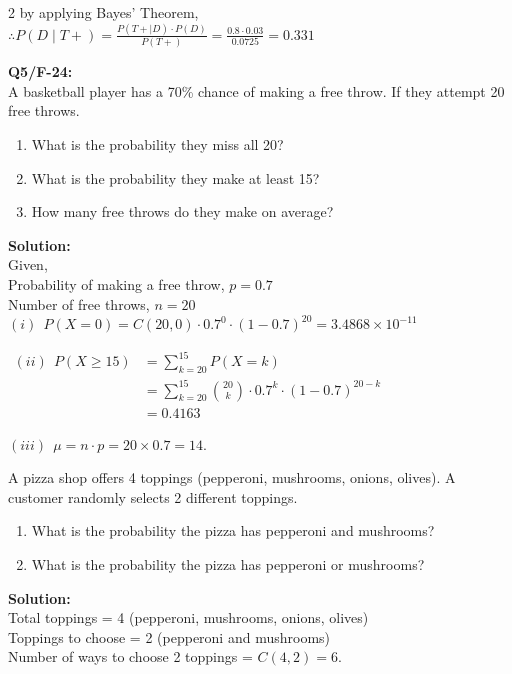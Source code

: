 \begin{multicols}{2}
by applying Bayes' Theorem,\\[0.5em]
$\therefore P(D\mid T+)
= \frac{P(T+\mid D) \cdot P(D)}{P(T+)}
= \frac{0.8 \cdot 0.03}{0.0725} = 0.331$

\columnbreak
\textbf{Q5/F-24:}\\[0.5em]
A basketball player has a 70\% chance of making a free throw. If they attempt 20 free throws.
\vspace{-1em}
\begin{enumerate}[leftmargin=*, label=$(\roman*)$]
\item What is the probability they miss all 20?
\item What is the probability they make at least 15?
\item How many free throws do they make on average?
\end{enumerate}

\textbf{Solution:}\\[0.5em]
Given,\\
Probability of making a free throw, $p = 0.7$\\
Number of free throws, $n = 20$\\

$(i) \ \
P(X = 0)
= C(20, 0) \cdot 0.7^0 \cdot (1-0.7)^{20}
= 3.4868 \times 10^{-11}$

$\begin{aligned}
(ii) \ \
P(X \geq 15)
&= \sum_{k=20}^{15} P(X = k) \\
&= \sum_{k=20}^{15} \binom{20}{k} \cdot 0.7^k \cdot (1-0.7)^{20-k}\\
&= 0.4163
\end{aligned}$

$(iii) \ \
\mu = n \cdot p = 20 \times 0.7 = 14$.


\vspace{2em}
A pizza shop offers 4 toppings (pepperoni, mushrooms, onions, olives). A customer randomly selects 2 different toppings.
\begin{enumerate}[leftmargin=*, label=$(\roman*)$]
\item What is the probability the pizza has pepperoni and mushrooms?
\item What is the probability the pizza has pepperoni or mushrooms?
\end{enumerate}

\textbf{Solution:}\\[0.5em]
Total toppings = 4 (pepperoni, mushrooms, onions, olives)\\
Toppings to choose = 2 (pepperoni and mushrooms)\\
Number of ways to choose 2 toppings = $C(4, 2) = 6$.


\end{multicols}
